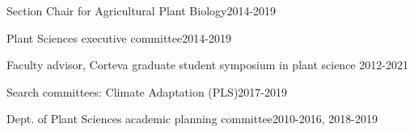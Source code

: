 \documentclass[letterpaper,10pt]{article}
\renewenvironment{itemize}{
  \begin{list}{}{
    \setlength{\leftmargin}{1.5em}
  }
}{
  \end{list}
}
\begin{document}
\begin{itemize}
\item Section Chair for Agricultural Plant Biology\hfill2014-2019
\item Plant Sciences executive committee\hfill2014-2019
\item Faculty advisor, Corteva graduate student symposium in plant science \hfill2012-2021
\item Search committees: Climate Adaptation (PLS)\hfill2017-2019

\item Dept. of Plant Sciences academic planning committee\hfill2010-2016, 2018-2019


\end{itemize}
\end{document}
